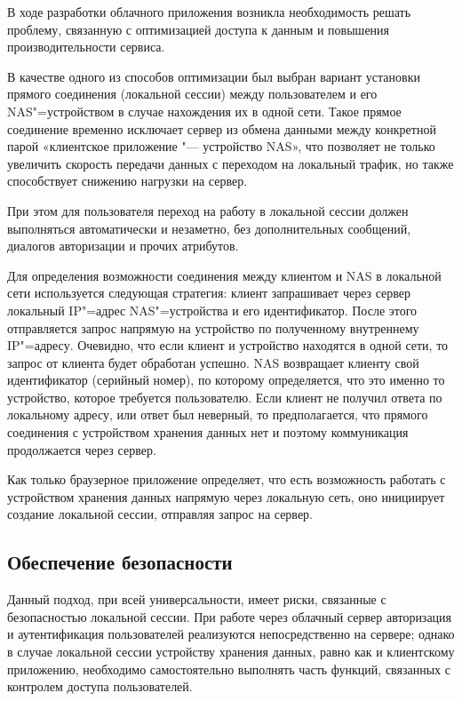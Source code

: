 \documentclass[10pt, a5paper]{article}
\begin{document}
В ходе разработки облачного приложения возникла необходимость решать проблему, связанную с оптимизацией доступа к данным и повышения производительности сервиса.

В качестве одного из способов оптимизации был выбран вариант установки прямого соединения (локальной сессии) между пользователем и его NAS"=устройством в случае нахождения их в одной сети. Такое прямое соединение временно исключает сервер из обмена данными между конкретной парой «клиентское приложение "--- устройство NAS», что  позволяет не только увеличить скорость передачи данных с переходом на локальный трафик, но также способствует снижению нагрузки на сервер.

При этом для пользователя переход на работу в локальной сессии должен выполняться автоматически и незаметно, без дополнительных сообщений, диалогов авторизации и прочих атрибутов.

Для определения возможности соединения между клиентом и NAS в локальной сети используется следующая стратегия: клиент запрашивает через сервер локальный IP"=адрес NAS"=устройства и его идентификатор.  После этого отправляется запрос напрямую на устройство по полученному внутреннему IP"=адресу. Очевидно, что если клиент и устройство находятся в одной сети, то запрос от клиента будет обработан успешно. NAS возвращает клиенту свой идентификатор (серийный номер), по которому определяется, что это именно то устройство, которое требуется пользователю. Если клиент не получил ответа по локальному адресу, или ответ был неверный, то предполагается, что прямого соединения с устройством хранения данных нет и поэтому коммуникация продолжается через сервер.

Как только браузерное приложение определяет, что есть возможность работать с устройством хранения данных напрямую через локальную сеть, оно инициирует создание локальной сессии, отправляя запрос на сервер.

\subsection*{Обеспечение безопасности}

Данный подход, при всей универсальности, имеет риски, связанные с безопасностью локальной сессии. При работе через облачный сервер авторизация и аутентификация пользователей реализуются непосредственно на сервере; однако в случае локальной сессии устройству хранения данных, равно как и клиентскому приложению, необходимо самостоятельно выполнять часть функций, связанных с контролем доступа пользователей.
\end{document}
